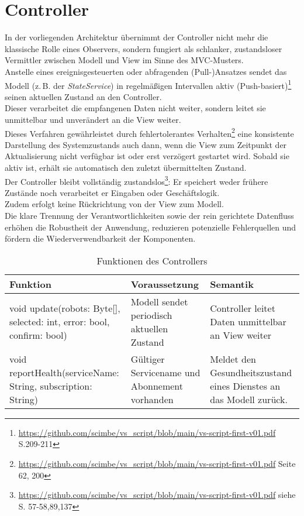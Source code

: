 \section{Controller}
In der vorliegenden Architektur übernimmt der Controller nicht mehr die klassische Rolle eines Observers, sondern fungiert als schlanker, zustandsloser Vermittler zwischen Modell und View im Sinne des MVC-Musters. \\
Anstelle eines ereignisgesteuerten oder abfragenden (Pull-)Ansatzes sendet das Modell (z.\,B. der \textit{StateService}) in regelmäßigen Intervallen aktiv (Push-basiert)\footnote{\url{https://github.com/scimbe/vs_script/blob/main/vs-script-first-v01.pdf} S.209-211} seinen aktuellen Zustand an den Controller. \\
Dieser verarbeitet die empfangenen Daten nicht weiter, sondern leitet sie unmittelbar und unverändert an die View weiter.\\
Dieses Verfahren gewährleistet durch fehlertolerantes Verhalten\footnote{\url{https://github.com/scimbe/vs_script/blob/main/vs-script-first-v01.pdf} Seite 62, 200} eine konsistente Darstellung des Systemzustands auch dann, wenn die View zum Zeitpunkt der Aktualisierung nicht verfügbar ist oder erst verzögert gestartet wird.
Sobald sie aktiv ist, erhält sie automatisch den zuletzt übermittelten Zustand.\\
Der Controller bleibt vollständig zustandslos\footnote{\url{https://github.com/scimbe/vs_script/blob/main/vs-script-first-v01.pdf} siehe S. 57-58,89,137}: Er speichert weder frühere Zustände noch verarbeitet er Eingaben oder Geschäftslogik. \\
Zudem erfolgt keine Rückrichtung von der View zum Modell. \\
Die klare Trennung der Verantwortlichkeiten sowie der rein gerichtete Datenfluss erhöhen die Robustheit der Anwendung, reduzieren potenzielle Fehlerquellen und fördern die Wiederverwendbarkeit der Komponenten.\\
\begin{table}[h!]
    \centering
    \begin{tabular}{|p{5cm}|p{5cm}|p{5cm}|}
        \hline
        \textbf{Funktion} & \textbf{Voraussetzung} & \textbf{Semantik} \\
        \hline
        void update(robots: Byte[], selected: int, error: bool, confirm: bool) & Modell sendet periodisch aktuellen Zustand & Controller leitet Daten unmittelbar an View weiter \\
        \hline
        void reportHealth(serviceName: String, subscription: String) & Gültiger Servicename und Abonnement vorhanden & Meldet den Gesundheitszustand eines Dienstes an das Modell zurück. \\
        \hline
    \end{tabular}
    \caption{Funktionen des Controllers}
    \label{tab:Controller}
\end{table}

